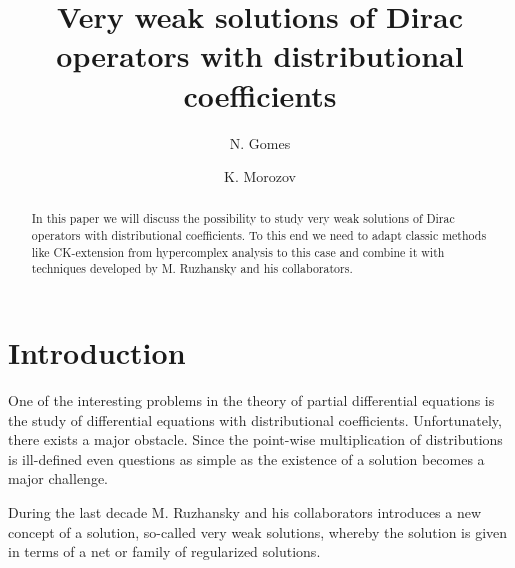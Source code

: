 \documentclass[12pt]{amsart}
\theoremstyle{definition}
\begin{document}
\title[Dirac operators with distributional coefficients]{Very weak solutions of Dirac operators with distributional coefficients }


\author[N. Gomes]{N. Gomes}
\address{(NG) CIDMA - Center for Research and Development in Mathematics and Applications, \newline Universidade de Cabo Verde \newline Campus 
  \newline Praia, Cabo Verde}
\email{}

\author[K. Morozov]{K. Morozov}
\address{(KM) CIDMA - Center for Research and Development in Mathematics and Applications, \newline Department of Mathematics, University of Aveiro \newline Campus Universit\'ario de Santiago
  -193 Aveiro, Portugal}
\email{}

%
%
%





\begin{abstract}
In this paper we will discuss the possibility to study very weak solutions of Dirac operators with distributional coefficients. To this end we need to adapt classic methods like CK-extension from hypercomplex analysis to this case and combine it with techniques developed by M. Ruzhansky and his collaborators. 
\end{abstract}

\maketitle



\section{Introduction}

One of the interesting problems in the theory of partial differential equations is the study of differential equations with distributional coefficients. Unfortunately, there exists a major obstacle. Since the point-wise multiplication of distributions is ill-defined even questions as simple as the existence of a solution becomes a major challenge. 

During the last decade M. Ruzhansky and his collaborators introduces a new concept of a solution, so-called very weak solutions, whereby the solution is given in terms of a net or family of regularized solutions. 
\end{document}

